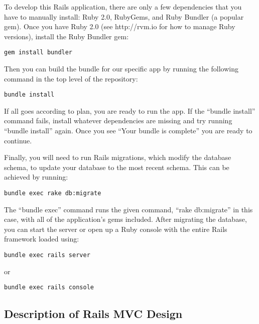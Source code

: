 \documentclass[12pt,letterpaper,titlepage]{article}
\begin{document}
To develop this Rails application, there are only a few dependencies that you have to manually install: Ruby 2.0, RubyGems,  and Ruby Bundler (a popular gem). Once you have Ruby 2.0 (see http://rvm.io for how to manage Ruby versions), install the Ruby Bundler gem:

\begin{lstlisting}
gem install bundler\end{lstlisting}

Then you can build the bundle for our specific app by running the following command in the top level of the repository:

\begin{lstlisting}
bundle install
\end{lstlisting}

If all goes according to plan, you are ready to run the app. If the ``bundle install'' command fails, install whatever dependencies are missing and try running ``bundle install'' again. Once you see ``Your bundle is complete'' you are ready to continue.

Finally, you will need to run Rails migrations, which modify the database schema, to update your database to the most recent schema. This can be achieved by running:

\begin{lstlisting}
bundle exec rake db:migrate
\end{lstlisting}

The ``bundle exec'' command runs the given command, ``rake db:migrate'' in this case, with all of the application's gems included. After migrating the database, you can start the server or open up a Ruby console with the entire Rails framework loaded using:

\begin{lstlisting}
bundle exec rails server
\end{lstlisting}
or
\begin{lstlisting}
bundle exec rails console
\end{lstlisting}

\subsection{Description of Rails MVC Design} \label{doc:DescriptionofRailsMVCDesign}
\end{document}
